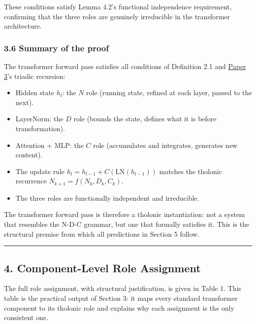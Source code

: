 \documentclass[
  11pt,
  letterpaper,
]{article}
\providecommand{\tightlist}{%
  \setlength{\itemsep}{0pt}\setlength{\parskip}{0pt}}
\begin{document}
These conditions satisfy Lemma 4.2's functional independence
requirement, confirming that the three roles are genuinely irreducible
in the transformer architecture.

\subsubsection{3.6 Summary of the proof}\label{summary-of-the-proof}

The transformer forward pass satisfies all conditions of Definition 2.1
and
\href{https://github.com/baardev/truevalue/blob/main/docnav/Research/papers/3_minimal-recursive-triadic-framework/3_minimal-recursive-triadic-framework.pdf}{Paper
3}'s triadic recursion:

\begin{itemize}
\tightlist
\item
  Hidden state \(h_l\): the \(N\) role (running state, refined at each
  layer, passed to the next).
\item
  LayerNorm: the \(D\) role (bounds the state, defines what it is before
  transformation).
\item
  Attention + MLP: the \(C\) role (accumulates and integrates, generates
  new content).
\item
  The update rule \(h_l = h_{l-1} + C(\text{LN}(h_{l-1}))\) matches the
  tholonic recurrence \(N_{k+1} = f(N_k, D_k, C_k)\).
\item
  The three roles are functionally independent and irreducible.
\end{itemize}

The transformer forward pass is therefore a tholonic instantiation: not
a system that resembles the N-D-C grammar, but one that formally
satisfies it. This is the structural premise from which all predictions
in Section 5 follow.

\begin{center}\rule{0.5\linewidth}{0.5pt}\end{center}

\subsection{4. Component-Level Role
Assignment}\label{component-level-role-assignment}

The full role assignment, with structural justification, is given in
Table 1. This table is the practical output of Section 3: it maps every
standard transformer component to its tholonic role and explains why
each assignment is the only consistent one.
\end{document}
